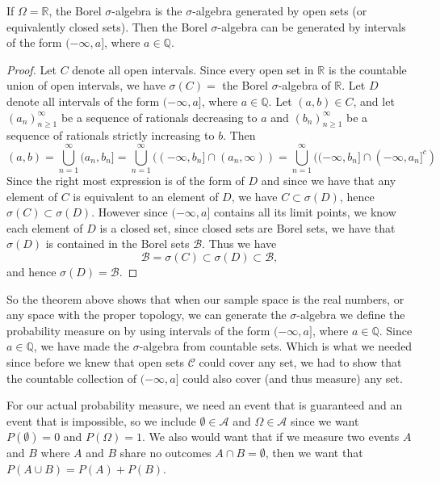 \documentclass[../main.tex]{subfiles}
\begin{document}
\begin{theorem}
If $\Omega = \mathbb{R}$, the Borel $\sigma$-algebra is the $\sigma$-algebra generated by open sets (or equivalently closed sets). Then the Borel $\sigma $-algebra can be generated by intervals of the form $ (-\infty, a] $, where $ a \in \mathbb{Q} $.
\end{theorem}

\begin{proof}
Let $C$ denote all open intervals. Since every open set in $ \mathbb{R} $ is the countable union of open intervals, we have $ \sigma(C) =  $ the Borel $ \sigma$-algebra of $\mathbb{R}$. Let $D$ denote all intervals of the form $(-\infty, a]$, where $ a \in \mathbb{Q}$. Let $ (a,b) \in C$, and let $ (a_n)^\infty_{n \geq 1} $ be a sequence of rationals decreasing to $a$ and $(b_n)^\infty_{n\geq1}$ be a sequence of rationals strictly increasing to $b$. Then
\[
(a,b) = \bigcup^\infty_{n=1}{(a_n, b_n]} = \bigcup^\infty_{n=1}{((-\infty, b_n] \cap (a_n, \infty))} = 
\bigcup^\infty_{n=1}{((-\infty, b_n] \cap (-\infty, a_n]^c)}
\]
Since the right most expression is of the form of $D$ and since we have that any element of $C$ is equivalent to an element of $D$, we have $ C \subset \sigma(D) $, hence $ \sigma(C) \subset \sigma(D) $. However since $ (-\infty, a]$ contains all its limit points, we know each element of $D$ is a closed set, since closed sets are Borel sets, we have that $\sigma(D)$ is contained in the Borel sets $ \mathcal{B}$. Thus we have
\[
\mathcal{B} = \sigma(C) \subset \sigma(D) \subset \mathcal{B},
\]
and hence $ \sigma(D) = \mathcal{B}.$
\end{proof}

\begin{remark}
So the theorem above shows that when our sample space is the real numbers, or any space with the proper topology, we can generate the $\sigma$-algebra we define the probability measure on by using intervals of the form $(-\infty, a]$, where $ a \in \mathbb{Q}$. Since $ a \in \mathbb{Q}$, we have made the $\sigma$-algebra from countable sets. Which is what we needed since before we knew that open sets $ \mathcal{C}$ could cover any set, we had to show that the countable collection of $(-\infty, a]$ could also cover (and thus measure) any set.
\end{remark}



\begin{remark}
For our actual probability measure, we need an event that is guaranteed and an event that is impossible, so we include $ \emptyset \in \mathcal{A} $ and $ \Omega \in \mathcal{A} $ since we want $ P(\emptyset) = 0 $ and $ P(\Omega) = 1 $. We also would want that if we measure two events $ A$ and $B$ where $A$ and $B$ share no outcomes $A \cap B = \emptyset$, then we want that $ P(A \cup B) = P(A) + P(B) $.
\end{remark}
\end{document}
